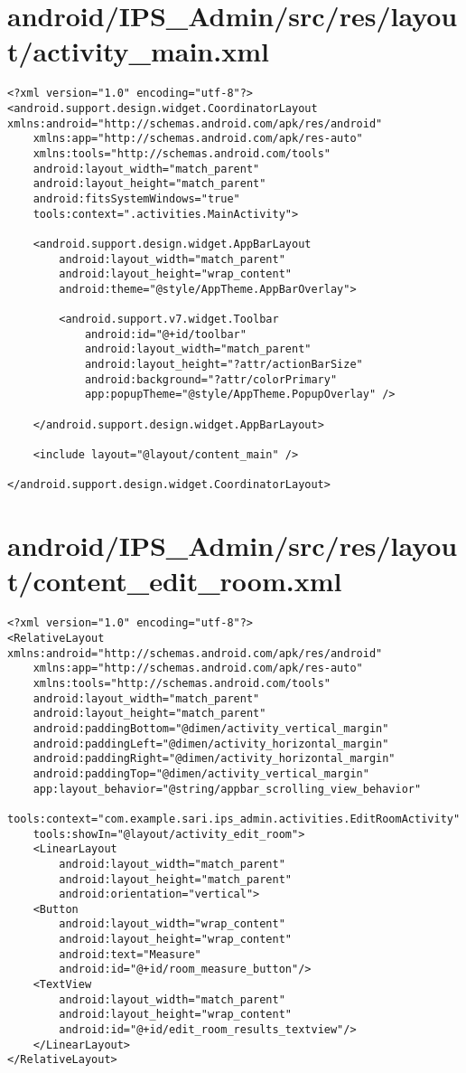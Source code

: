 \section{android/IPS\_Admin/src/res/layout/activity\_main.xml}
\begin{lstlisting}<?xml version="1.0" encoding="utf-8"?>
<android.support.design.widget.CoordinatorLayout xmlns:android="http://schemas.android.com/apk/res/android"
    xmlns:app="http://schemas.android.com/apk/res-auto"
    xmlns:tools="http://schemas.android.com/tools"
    android:layout_width="match_parent"
    android:layout_height="match_parent"
    android:fitsSystemWindows="true"
    tools:context=".activities.MainActivity">

    <android.support.design.widget.AppBarLayout
        android:layout_width="match_parent"
        android:layout_height="wrap_content"
        android:theme="@style/AppTheme.AppBarOverlay">

        <android.support.v7.widget.Toolbar
            android:id="@+id/toolbar"
            android:layout_width="match_parent"
            android:layout_height="?attr/actionBarSize"
            android:background="?attr/colorPrimary"
            app:popupTheme="@style/AppTheme.PopupOverlay" />

    </android.support.design.widget.AppBarLayout>

    <include layout="@layout/content_main" />

</android.support.design.widget.CoordinatorLayout>
\end{lstlisting}
\newpage
\section{android/IPS\_Admin/src/res/layout/content\_edit\_room.xml}
\begin{lstlisting}<?xml version="1.0" encoding="utf-8"?>
<RelativeLayout xmlns:android="http://schemas.android.com/apk/res/android"
    xmlns:app="http://schemas.android.com/apk/res-auto"
    xmlns:tools="http://schemas.android.com/tools"
    android:layout_width="match_parent"
    android:layout_height="match_parent"
    android:paddingBottom="@dimen/activity_vertical_margin"
    android:paddingLeft="@dimen/activity_horizontal_margin"
    android:paddingRight="@dimen/activity_horizontal_margin"
    android:paddingTop="@dimen/activity_vertical_margin"
    app:layout_behavior="@string/appbar_scrolling_view_behavior"
    tools:context="com.example.sari.ips_admin.activities.EditRoomActivity"
    tools:showIn="@layout/activity_edit_room">
    <LinearLayout
        android:layout_width="match_parent"
        android:layout_height="match_parent"
        android:orientation="vertical">
    <Button
        android:layout_width="wrap_content"
        android:layout_height="wrap_content"
        android:text="Measure"
        android:id="@+id/room_measure_button"/>
    <TextView
        android:layout_width="match_parent"
        android:layout_height="wrap_content"
        android:id="@+id/edit_room_results_textview"/>
    </LinearLayout>
</RelativeLayout>
\end{lstlisting}
\newpage
